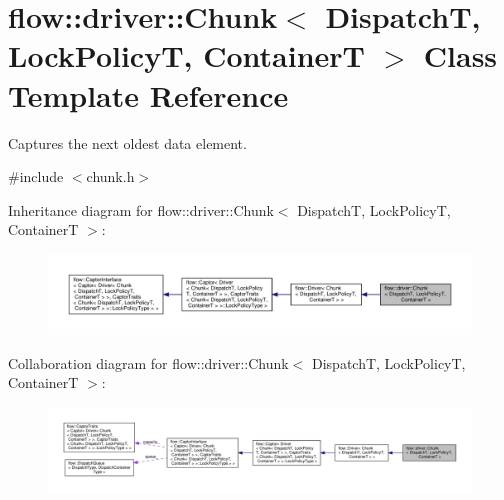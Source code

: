 \hypertarget{classflow_1_1driver_1_1_chunk}{}\section{flow\+:\+:driver\+:\+:Chunk$<$ DispatchT, Lock\+PolicyT, ContainerT $>$ Class Template Reference}
\label{classflow_1_1driver_1_1_chunk}


Captures the next oldest data element.  




{\ttfamily \#include $<$chunk.\+h$>$}



Inheritance diagram for flow\+:\+:driver\+:\+:Chunk$<$ DispatchT, Lock\+PolicyT, ContainerT $>$\+:\nopagebreak
\begin{figure}[H]
\begin{center}
\leavevmode
\includegraphics[width=350pt]{classflow_1_1driver_1_1_chunk__inherit__graph}
\end{center}
\end{figure}


Collaboration diagram for flow\+:\+:driver\+:\+:Chunk$<$ DispatchT, Lock\+PolicyT, ContainerT $>$\+:\nopagebreak
\begin{figure}[H]
\begin{center}
\leavevmode
\includegraphics[width=350pt]{classflow_1_1driver_1_1_chunk__coll__graph}
\end{center}
\end{figure}
